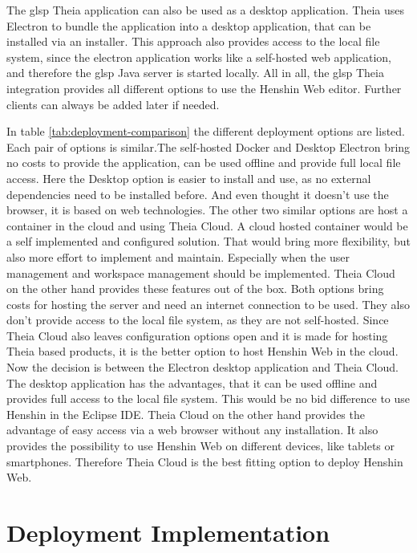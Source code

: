   The \ac{glsp} Theia application can also be used as a desktop application. Theia uses Electron \cite{electron-repo} to bundle the application into a desktop application, that can be installed via an installer. This approach also provides access to the local file system, since the electron application works like a self-hosted web application, and therefore the \ac{glsp} Java server is started locally. All in all, the \ac{glsp} Theia integration provides all different options to use the Henshin Web editor. Further clients can always be added later if needed.

  

  In table \ref{tab:deployment-comparison} the different deployment options are listed. Each pair of options is similar.The self-hosted Docker and Desktop Electron bring no costs to provide the application, can be used offline and provide full local file access. Here the Desktop option is easier to install and use, as no external dependencies need to be installed before. And even thought it doesn't use the browser, it is based on web technologies. The other two similar options are host a container in the cloud and using Theia Cloud. A cloud hosted container would be a self implemented and configured solution. That would bring more flexibility, but also more effort to implement and maintain. Especially when the user management and workspace management should be implemented. Theia Cloud on the other hand provides these features out of the box. Both options bring costs for hosting the server and need an internet connection to be used. They also don't provide access to the local file system, as they are not self-hosted. Since Theia Cloud also leaves configuration options open and it is made for hosting Theia based products, it is the better option to host Henshin Web in the cloud.
  Now the decision is between the Electron desktop application and Theia Cloud. The desktop application has the advantages, that it can be used offline and provides full access to the local file system. This would be no bid difference to use Henshin in the Eclipse IDE. Theia Cloud on the other hand provides the advantage of easy access via a web browser without any installation. It also provides the possibility to use Henshin Web on different devices, like tablets or smartphones. Therefore Theia Cloud is the best fitting option to deploy Henshin Web.
  
 \section{Deployment Implementation}
  \label{sec:deployment-implementation}

